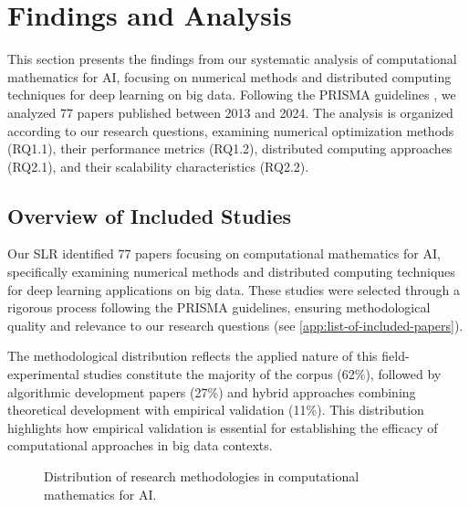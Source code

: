 \documentclass[acmsmall]{acmart}
\begin{document}
\section{Findings and Analysis}\label{sec:findings-and-analysis}
This section presents the findings from our systematic analysis of computational mathematics for AI, focusing on numerical methods and distributed computing techniques for deep learning on big data. Following the PRISMA guidelines \citep{moher2009preferred}, we analyzed 77 papers published between 2013 and 2024. The analysis is organized according to our research questions, examining numerical optimization methods (RQ1.1), their performance metrics (RQ1.2), distributed computing approaches (RQ2.1), and their scalability characteristics (RQ2.2).


\subsection{Overview of Included Studies}\label{subsec:overview-of-included-studies}
Our SLR identified 77 papers focusing on computational mathematics for AI, specifically examining numerical methods and distributed computing techniques for deep learning applications on big data. These studies were selected through a rigorous process following the PRISMA guidelines, ensuring methodological quality and relevance to our research questions (see \cref{app:list-of-included-papers}).

The methodological distribution reflects the applied nature of this field-experimental studies constitute the majority of the corpus (62\%), followed by algorithmic development papers (27\%) and hybrid approaches combining theoretical development with empirical validation (11\%). This distribution highlights how empirical validation is essential for establishing the efficacy of computational approaches in big data contexts.

\begin{figure}[H]
    \centering
    \caption{Distribution of research methodologies in computational mathematics for AI.}
    \label{fig:methodology_distribution}
\end{figure}
\end{document}
